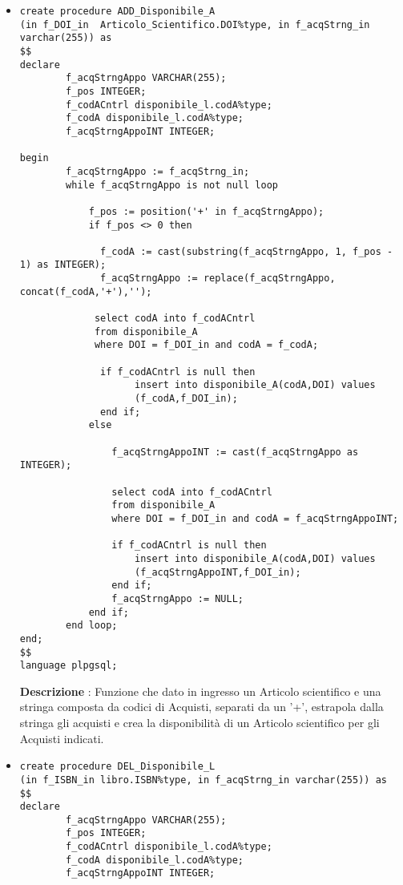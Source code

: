 \begin{itemize}
\item\begin{verbatim}
create procedure ADD_Disponibile_A
(in f_DOI_in  Articolo_Scientifico.DOI%type, in f_acqStrng_in varchar(255)) as
$$
declare
        f_acqStrngAppo VARCHAR(255);
        f_pos INTEGER;
        f_codACntrl disponibile_l.codA%type;
        f_codA disponibile_l.codA%type;
        f_acqStrngAppoINT INTEGER;
	
begin
        f_acqStrngAppo := f_acqStrng_in;
        while f_acqStrngAppo is not null loop
		
            f_pos := position('+' in f_acqStrngAppo);
            if f_pos <> 0 then 
		
              f_codA := cast(substring(f_acqStrngAppo, 1, f_pos - 1) as INTEGER);
              f_acqStrngAppo := replace(f_acqStrngAppo, concat(f_codA,'+'),'');
			
             select codA into f_codACntrl
             from disponibile_A 
             where DOI = f_DOI_in and codA = f_codA;

              if f_codACntrl is null then 
                    insert into disponibile_A(codA,DOI) values 
                    (f_codA,f_DOI_in);
              end if;
            else
			
                f_acqStrngAppoINT := cast(f_acqStrngAppo as INTEGER);
			
                select codA into f_codACntrl
                from disponibile_A 
                where DOI = f_DOI_in and codA = f_acqStrngAppoINT;
			
                if f_codACntrl is null then 
                    insert into disponibile_A(codA,DOI) values 
                    (f_acqStrngAppoINT,f_DOI_in);
                end if;
                f_acqStrngAppo := NULL;
            end if;
        end loop;
end;
$$
language plpgsql;

\end{verbatim}
{\bf Descrizione} : Funzione che dato in ingresso un Articolo scientifico e una stringa composta da codici di Acquisti, separati da un '+', estrapola dalla stringa gli acquisti e crea la disponibilità di un Articolo scientifico per gli Acquisti indicati.


\item\begin{verbatim}
create procedure DEL_Disponibile_L
(in f_ISBN_in libro.ISBN%type, in f_acqStrng_in varchar(255)) as
$$
declare
        f_acqStrngAppo VARCHAR(255);
        f_pos INTEGER;
        f_codACntrl disponibile_l.codA%type;
        f_codA disponibile_l.codA%type;
        f_acqStrngAppoINT INTEGER;
	

\end{verbatim}
\end{itemize}
